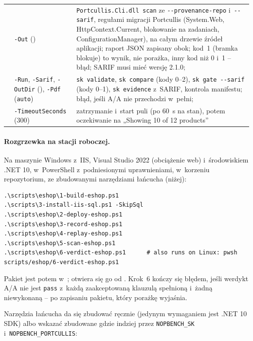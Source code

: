 {\begin{xltabular}{\linewidth}{@{}>{\raggedright\arraybackslash}p{3.3cm} >{\raggedright\arraybackslash}p{3.9cm} >{\raggedright\arraybackslash}X@{}}
 & \texttt{-Out} () &
  \texttt{Portcullis.Cli.dll scan} ze \texttt{-{}-provenance-repo} i~\texttt{-{}-sarif}, regułami
  migracji Portcullis (System.Web, HttpContext.Current, blokowanie na zadaniach,
  ConfigurationManager), na całym drzewie źródeł aplikacji; raport JSON zapisany obok;
  kod~1 (bramka blokuje) to wynik, nie porażka, inny kod niż 0 i~1 -- błąd; SARIF musi mieć
  wersję 2.1.0;  \\
 & \texttt{-Run}, \texttt{-Sarif}, \texttt{-OutDir}
  (), \texttt{-Pdf} (\texttt{auto}) & \texttt{sk validate},
  \texttt{sk compare} (kody 0--2), \texttt{sk gate -{}-sarif} (kody 0--1), \texttt{sk
  evidence} z~SARIF, kontrola manifestu; błąd, jeśli A/A nie przechodzi w~pełni;
   \\
 & \texttt{-TimeoutSeconds} (300) & zatrzymanie i~start puli (po
  60~s na stan), potem oczekiwanie na „Showing 10 of 12 products” \\
\end{xltabular}
}

\paragraph{Rozgrzewka na stacji roboczej.} Na maszynie Windows z~IIS, Visual Studio 2022
(obciążenie web) i~środowiskiem .NET 10, w~PowerShell z~podniesionymi uprawnieniami,
w~korzeniu repozytorium, ze zbudowanymi narzędziami łańcucha (niżej):

\begin{lstlisting}
.\scripts\eshop\1-build-eshop.ps1
.\scripts\3-install-iis-sql.ps1 -SkipSql
.\scripts\eshop\2-deploy-eshop.ps1
.\scripts\eshop\3-record-eshop.ps1
.\scripts\eshop\4-replay-eshop.ps1
.\scripts\eshop\5-scan-eshop.ps1
.\scripts\eshop\6-verdict-eshop.ps1      # also runs on Linux: pwsh scripts/eshop/6-verdict-eshop.ps1
\end{lstlisting}

Pakiet jest potem w~; otwiera się go od .
Krok~6 kończy się błędem, jeśli werdykt A/A nie jest \texttt{pass} z~każdą zaakceptowaną
klauzulą spełnioną i~żadną niewykonaną -- po zapisaniu pakietu, który porażkę wyjaśnia.

Narzędzia łańcucha da się zbudować ręcznie (jedynym wymaganiem jest .NET 10 SDK) albo
wskazać zbudowane gdzie indziej przez \texttt{NOPBENCH\_SK} i~\texttt{NOPBENCH\_PORTCULLIS}:

